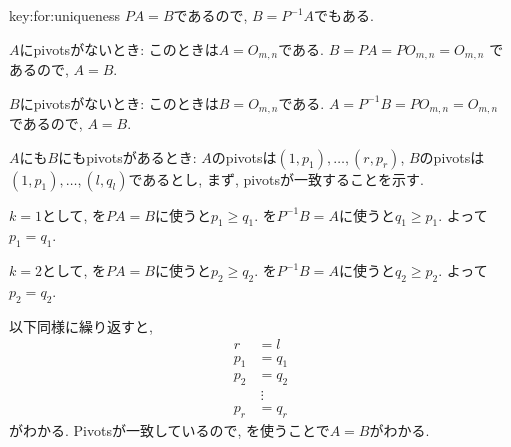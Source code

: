 \begin{proofof}{key:for:uniqueness}
  $PA=B$であるので, $B=P^{-1}A$でもある.
  
  $A$にpivotsがないとき:
  このときは$A=O_{m,n}$である.
  $B=PA=PO_{m,n}=O_{m,n}$
  であるので, $A=B$.

  $B$にpivotsがないとき:
  このときは$B=O_{m,n}$である.
  $A=P^{-1}B=PO_{m,n}=O_{m,n}$
  であるので, $A=B$.

  $A$にも$B$にもpivotsがあるとき:
  $A$のpivotsは$(1,p_1),\ldots,(r,p_r)$,
  $B$のpivotsは$(1,p_1),\ldots,(l,q_l)$であるとし,
  まず, pivotsが一致することを示す.
  
  $k=1$として,
  を$PA=B$に使うと$p_1\geq q_1$.
  を$P^{-1}B=A$に使うと$q_1\geq p_1$.
  よって$p_1=q_1$.

  $k=2$として,
  を$PA=B$に使うと$p_2\geq q_2$.
  を$P^{-1}B=A$に使うと$q_2\geq p_2$.
  よって$p_2=q_2$.

  以下同様に繰り返すと,
  \begin{align*}
    r&=l\\
    p_1&=q_1\\
    p_2&=q_2\\
    &\ \vdots\\
    p_r&=q_r
  \end{align*}
  がわかる.
  Pivotsが一致しているので,
  を使うことで$A=B$がわかる.
\end{proofof}

